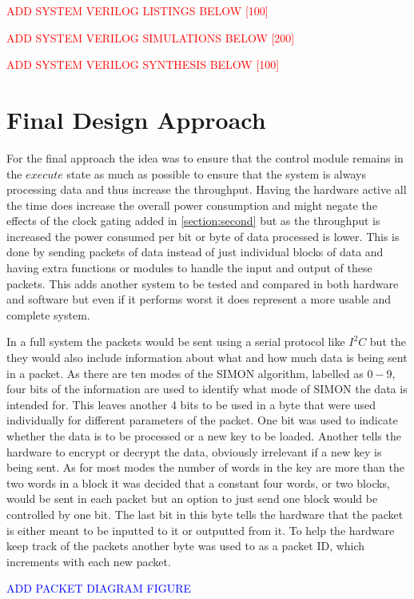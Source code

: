 \documentclass[12pt,twoside,a4paper]{report}
\begin{document}
	\textcolor{red}{ADD SYSTEM VERILOG LISTINGS BELOW [100]}
    
	\textcolor{red}{ADD SYSTEM VERILOG SIMULATIONS BELOW [200]}
    
	\textcolor{red}{ADD SYSTEM VERILOG SYNTHESIS BELOW [100]}
    
	\chapter{Final Design Approach}
	\label{chapter:FINAL}
	For the final approach the idea was to ensure that the control module remains in the $execute$ state as much as possible to ensure that the system is always processing data and thus increase the throughput. Having the hardware active all the time does increase the overall power consumption and might negate the effects of the clock gating added in \autoref{section:second} but as the throughput is increased the power consumed per bit or byte of data processed is lower. This is done by sending packets of data instead of just individual blocks of data and having extra functions or modules to handle the input and output of these packets. This adds another system to be tested and compared in both hardware and software but even if it performs worst it does represent a more usable and complete system.
    
	In a full system the packets would be sent using a serial protocol like $I^2C$ but the they would also include information about what and how much data is being sent in a packet. As there are ten modes of the SIMON algorithm, labelled as $0 - 9$, four bits of the information are used to identify what mode of SIMON the data is intended for. This leaves another 4 bits to be used in a byte that were used individually for different parameters of the packet. One bit was used to indicate whether the data is to be processed or a new key to be loaded. Another tells the hardware to encrypt or decrypt the data, obviously irrelevant if a new key is being sent. As for most modes the number of words in the key are more than the two words in a block it was decided that a constant four words, or two blocks, would be sent in each packet but an option to just send one block would be controlled by one bit. The last bit in this byte tells the hardware that the packet is either meant to be inputted to it or outputted from it. To help the hardware keep track of the packets another byte was used to as a packet ID, which increments with each new packet.
    
	\textcolor{blue}{ADD PACKET DIAGRAM FIGURE}
	
\end{document}
